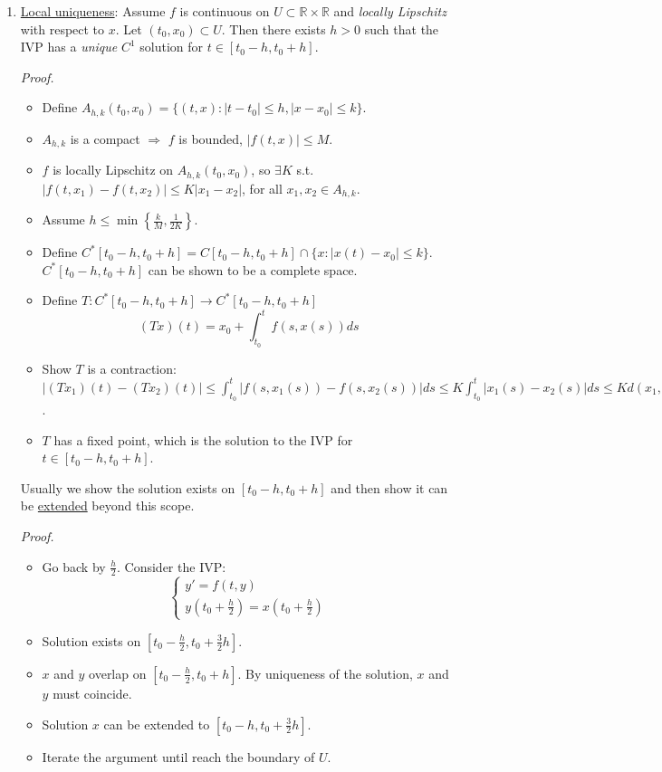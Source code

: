 \documentclass[%
 aip,
 jmp,%
 amsmath,amssymb,
 reprint,%
]{revtex4-1}
\def\R{{\mathbb R}}
\def\Ra{\Rightarrow}
\renewenvironment{proof}{\color{gray}\footnotesize\emph{Proof.}}{}
\newcommand{\defn}[1]{\underline{#1}}
\begin{document}
\begin{enumerate}
    \item \defn{Local uniqueness}: Assume $f$ is continuous on $U\subset \R\times\R$
    and \emph{locally Lipschitz} with respect to $x$. Let $(t_0, x_0)\subset U$.
    Then there exists $h>0$ such that the IVP has a \emph{unique} $C^1$ solution
    for $t \in [t_0 - h, t_0 + h]$.

    \begin{proof}
      \begin{itemize}
        \item Define $A_{h,k}(t_0, x_0) = \{(t,x):|t - t_0| \le h, |x - x_0| \le k\}$.
        \item $A_{h,k}$ is a compact $\Ra$ $f$ is bounded,  $|f(t,x)|\le M$.
        \item $f$ is locally Lipschitz on $A_{h,k}(t_0, x_0)$, so $\exists K$ s.t.
              $|f(t,x_1) - f(t,x_2)| \le K|x_1 - x_2|$, for all $x_1, x_2\in A_{h,k}$.
        \item Assume $h \le \min\left\{ \frac{k}{M}, \frac{1}{2K} \right\}$.
        \item Define $C^*[t_0-h, t_0+h] = C[t_0-h, t_0+h] \cap \{x: |x(t)-x_0| \le k \}$.
              $C^*[t_0-h, t_0+h]$ can be shown to be a complete space.
        \item Define $T: C^*[t_0-h, t_0+h] \to C^*[t_0-h, t_0+h]$
              $$ (Tx)(t) = x_0 + \int_{t_0}^{t} f(s,x(s)) ds $$
        \item Show $T$ is a contraction:
        $|(Tx_1)(t) - (Tx_2)(t)| \le \int_{t_0}^{t} |f(s,x_1(s)) - f(s,x_2(s))| ds
         \le K \int_{t_0}^{t} |x_1(s) - x_2(s)|ds \le Kd(x_1,x_2)h \le \frac{1}{2}d(x_1,x_2)$.
        \item $T$ has a fixed point, which is the solution to the IVP for $t \in [t_0 - h, t_0 + h]$.
      \end{itemize}
    \end{proof}

    Usually we show the solution exists on $[t_0 - h, t_0 + h]$ and then show
    it can be \defn{extended} beyond this scope.

    \begin{proof}
      \begin{itemize}
        \item Go back by $\frac{h}{2}$. Consider the IVP:
              \[ \begin{cases}
                  y' = f(t,y) \\
                  y(t_0 + \frac{h}{2}) = x(t_0 + \frac{h}{2})
              \end{cases}\]
        \item Solution exists on $[t_0 - \frac{h}{2}, t_0 + \frac{3}{2}h]$.
        \item $x$ and $y$ overlap on $[t_0-\frac{h}{2}, t_0+h]$.
              By uniqueness of the solution, $x$ and $y$ must coincide.
        \item Solution $x$ can be extended to $[t_0-h, t_0+\frac{3}{2}h]$.
        \item Iterate the argument until reach the boundary of $U$.
      \end{itemize}
    \end{proof}

\end{enumerate}

\vspace{3in} %
\end{document}
